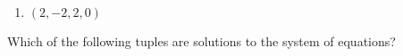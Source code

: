 \documentclass{ximera}
\begin{document}
\begin{problem}
\begin{enumerate}
        \item $(2,-2,2,0)$
        \begin{selectAll}
        \end{selectAll}
      \end{enumerate}    
      
      Which of the following tuples are solutions to the system of equations?

        \begin{selectAll}
        \end{selectAll}

\end{problem}
\end{document}
